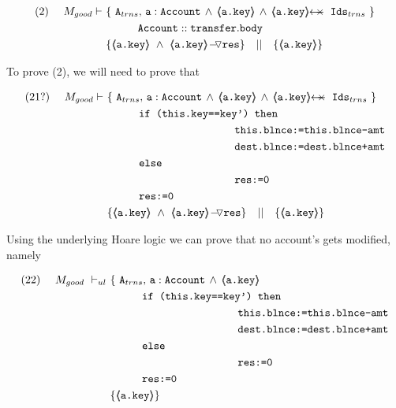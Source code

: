 \begin{lemma} 
\label{l:transfer:S2}
\small
\begin{align*}
\text{(2)}  \ \ \ \ M_{good} \vdash \ 
		&	\{  \ \Alocalstr, \, \prg{a}:\prg{Account}\, \wedge\,  {\inside{\prg{a.key}}} \, \wedge \, \protectedFrom {\prg{a.key}} {\Idstr}  \  \} \\
		& \SPT \prg{Account}::\prg{transfer}.\prg{body}\ \\  
		& \{ {\inside{\prg{a.key}}}\ \wedge\ {\PushASLong {\prg{res}} {\inside{\prg{a.key}}}}  \} \ \ \  || \ \ \ 
		   \{ {\inside{\prg{a.key}}} \}
\end{align*}
\normalsize

\end{lemma}

\begin{proofO}

To prove (2), we will need to prove that

\small
\begin{align*}
\text{(21?)}  \ \ \ \ M_{good} \vdash \ 
		&	\{  \ \Alocalstr, \, \prg{a}:\prg{Account}\, \wedge\,  {\inside{\prg{a.key}}} \, \wedge \, \protectedFrom {\prg{a.key}} {\Idstr}  \  \} \\
		&  \SPT   \prg{if (this.key==key') then }\\
		& \SPT \SPT   \SPT\SPT  \prg{this.\balance:=this.\balance-amt} \\
	        & \SPT \SPT   \SPT\SPT  \prg{dest.\balance:=dest.\balance+amt} \\
		& \SPT   \prg{else }\\
		& \SPT\SPT   \SPT\SPT  \prg{res:=0} \\
		& \SPT \prg{res:=0} \\
		& \{ {\inside{\prg{a.key}}}\ \wedge\ {\PushASLong {\prg{res}} {\inside{\prg{a.key}}}}  \} \ \ \  || \ \ \ 
		   \{ {\inside{\prg{a.key}}} \}
\end{align*}
\normalsize

Using the underlying Hoare logic we can prove that no account's  gets modified, namely

\small
\begin{align*}
\text{(22)}  \ \ \ \ M_{good}\ \vdash_{ul} \ 
		&	\{  \ \Alocalstr, \, \prg{a}:\prg{Account}\, \wedge\,   {\inside{\prg{a.key}}} \\
		&  \SPT   \prg{if (this.key==key') then }\\
		& \SPT \SPT   \SPT\SPT  \prg{this.\balance:=this.\balance-amt} \\
	        & \SPT \SPT   \SPT\SPT  \prg{dest.\balance:=dest.\balance+amt} \\
		& \SPT   \prg{else }\\
		& \SPT\SPT   \SPT\SPT  \prg{res:=0} \\
		& \SPT \prg{res:=0} \\
		& \{    \inside{\prg{a.key}}   \} \ \ \ 
\end{align*}
\normalsize


\end{proofO}
